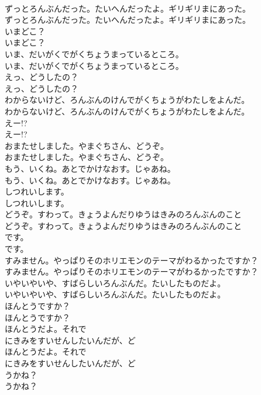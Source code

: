 \documentclass[8pt]{extreport}
\begin{document}
\begin{CJK}{UTF8}{min}
\\	ずっとろんぶんだった。たいへんだったよ。ギリギリまにあった。
\\	ずっとろんぶんだった。たいへんだったよ。ギリギリまにあった。
\\	いまどこ？
\\	いまどこ？
\\	いま、だいがくでがくちょうまっているところ。
\\	いま、だいがくでがくちょうまっているところ。
\\	えっ、どうしたの？
\\	えっ、どうしたの？
\\	わからないけど、ろんぶんのけんでがくちょうがわたしをよんだ。
\\	わからないけど、ろんぶんのけんでがくちょうがわたしをよんだ。
\\	えー!?
\\	えー!?
\\	おまたせしました。やまぐちさん、どうぞ。
\\	おまたせしました。やまぐちさん、どうぞ。
\\	もう、いくね。あとでかけなおす。じゃあね。
\\	もう、いくね。あとでかけなおす。じゃあね。
\\	しつれいします。
\\	しつれいします。
\\	どうぞ。すわって。きょうよんだりゆうはきみのろんぶんのこと
\\	どうぞ。すわって。きょうよんだりゆうはきみのろんぶんのこと
\\	です。
\\	です。
\\	すみません。やっぱりそのホリエモンのテーマがわるかったですか？
\\	すみません。やっぱりそのホリエモンのテーマがわるかったですか？
\\	いやいやいや、すばらしいろんぶんだ。たいしたものだよ。
\\	いやいやいや、すばらしいろんぶんだ。たいしたものだよ。
\\	ほんとうですか？
\\	ほんとうですか？
\\	ほんとうだよ。それで
\\	にきみをすいせんしたいんだが、ど
\\	ほんとうだよ。それで
\\	にきみをすいせんしたいんだが、ど
\\	うかね？
\\	うかね？

\end{CJK}
\end{document}

